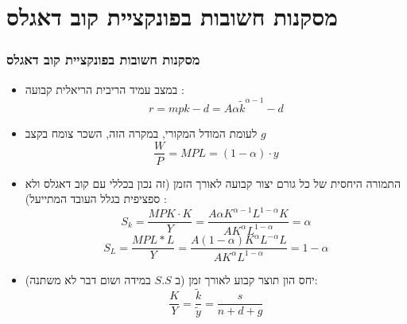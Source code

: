\documentclass[usenames,dvipsnames,10pt]{beamer}
\begin{document}
\begin{RTL}
\begin{frame}[allowframebreaks]
\end{frame}

\section{מסקנות חשובות בפונקציית קוב דאגלס}

\begin{frame}[allowframebreaks]
    \frametitle{מסקנות חשובות בפונקציית קוב דאגלס}
    \begin{itemize}
        \item במצב עמיד הריבית הריאלית קבועה : 
        $$r = mpk - d = A\alpha \tilde{k} ^ {\alpha - 1 } - d $$
        \item לעומת המודל המקורי, במקרה הזה, השכר צומח בקצב $g$ $$\frac{W}{P} = MPL = \left(1-\alpha\right)\cdot y$$
        \item התמורה היחסית של כל גורם יצור קבועה לאורך הזמן (זה נכון בכללי עם קוב דאגלס ולא ספציפית בגלל העובד המתייעל) : $$S_k = \frac{MPK \cdot K}{Y } = \frac{A \alpha K^{\alpha - 1 } L ^{1 - \alpha} K }{A K^\alpha L^{1-\alpha}} = \alpha$$ $$
        {S}_L=\frac{M P L * L}{Y}=\frac{A(1-\alpha) K^\alpha L^{-\alpha} L}{A K^\alpha L^{1-\alpha}}=1-\alpha
        $$
        \item יחס הון תוצר קבוע לאורך זמן (ב $S.S$ במידה ושום דבר לא משתנה): $$\frac{K}{Y} = \frac{\tilde{k}}{\tilde{y}} = \frac{s}{n+d+g}$$
    \end{itemize}
    

\end{frame}

\end{RTL}
\end{document}
